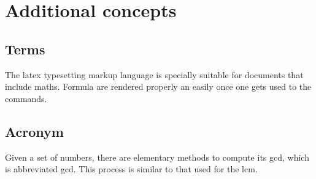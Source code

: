 \documentclass[../main.tex]{subfiles}
\begin{document}
\chapter{Additional concepts}
\label{chap:tutorial6}

\section{Terms}

The \gls{latex} typesetting markup language is specially suitable 
for documents that include maths. Formula are rendered 
properly an easily once one gets used to the commands.

\section{Acronym}

Given a set of numbers, there are elementary methods to compute 
its \ac{gcd}, which is abbreviated gcd. This 
process is similar to that used for the lcm.
\end{document}
